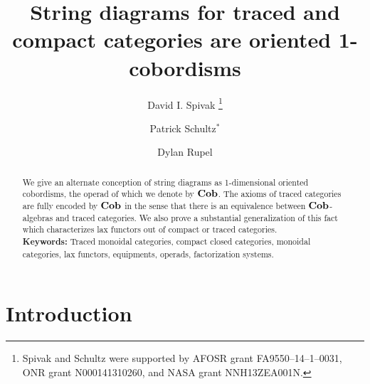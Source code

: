 \documentclass[11pt,oneside,article]{memoir}
\title{String diagrams for traced and compact categories are oriented 1-cobordisms}
\author{
   David I. Spivak%
      \thanks{Spivak and Schultz were supported by AFOSR grant FA9550--14--1--0031, ONR grant N000141310260, and NASA grant NNH13ZEA001N.}
   \and Patrick Schultz${}^*$%
   \and Dylan Rupel
}
\date{\vspace{-3ex}}
\begin{document}
\tightlists
\firmlists

\maketitle
\begin{abstract}
   We give an alternate conception of string diagrams as 1-dimensional oriented cobordisms, the
   operad of which we denote by $\mathbf{Cob}$. The axioms of traced categories are fully encoded by $\mathbf{Cob}$
   in the sense that there is an equivalence between $\mathbf{Cob}$-algebras and
   traced categories. We also prove a substantial generalization of this fact which characterizes
   lax functors out of compact or traced categories. \\

   \noindent\textbf{Keywords:} Traced monoidal categories, compact closed categories, monoidal categories, lax functors, equipments, operads, factorization systems.
\end{abstract}


\chapter{Introduction}\label{chap:intro}
\end{document}
